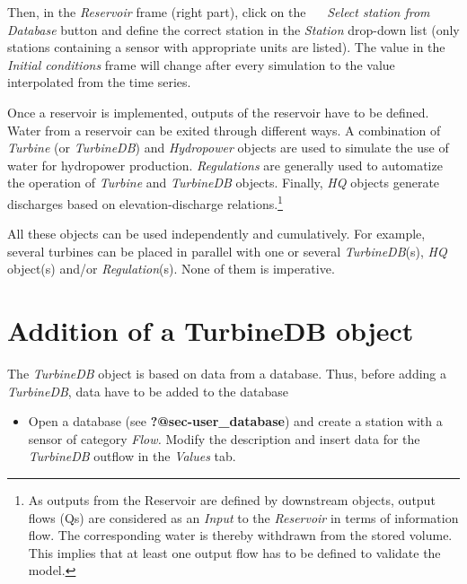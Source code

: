 \documentclass[
  letterpaper,
  DIV=11,
  numbers=noendperiod]{scrreprt}
\providecommand{\tightlist}{%
  \setlength{\itemsep}{0pt}\setlength{\parskip}{0pt}}\usepackage{longtable,booktabs,array}
\begin{document}
Then, in the \emph{Reservoir} frame (right part), click on the
\includegraphics[width=0.15in,height=0in]{./figures/fig-icon_arrow_down_menu.png}
\emph{Select station from Database} button and define the correct
station in the \emph{Station} drop-down list (only stations containing a
sensor with appropriate units are listed). The value in the
\emph{Initial conditions} frame will change after every simulation to
the value interpolated from the time series.

Once a reservoir is implemented, outputs of the reservoir have to be
defined. Water from a reservoir can be exited through different ways. A
combination of \emph{Turbine} (or \emph{TurbineDB}) and
\emph{Hydropower} objects are used to simulate the use of water for
hydropower production. \emph{Regulations} are generally used to
automatize the operation of \emph{Turbine} and \emph{TurbineDB} objects.
Finally, \emph{HQ} objects generate discharges based on
elevation-discharge relations.\footnote{As outputs from the Reservoir
  are defined by downstream objects, output flows (Qs) are considered as
  an \emph{Input} to the \emph{Reservoir} in terms of information flow.
  The corresponding water is thereby withdrawn from the stored volume.
  This implies that at least one output flow has to be defined to
  validate the model.}

All these objects can be used independently and cumulatively. For
example, several turbines can be placed in parallel with one or several
\emph{TurbineDB}(s), \emph{HQ} object(s) and/or \emph{Regulation}(s).
None of them is imperative.

\hypertarget{addition-of-a-turbinedb-object}{%
\section{Addition of a TurbineDB
object}\label{addition-of-a-turbinedb-object}}

The \emph{TurbineDB} object is based on data from a database. Thus,
before adding a \emph{TurbineDB}, data have to be added to the database

\begin{itemize}
\tightlist
\item
  {Open a database (see \textbf{?@sec-user\_database}) and create a
  station with a sensor of category \emph{Flow.} Modify the description
  and insert data for the \emph{TurbineDB} outflow in the \emph{Values}
  tab.}
\end{itemize}
\end{document}
